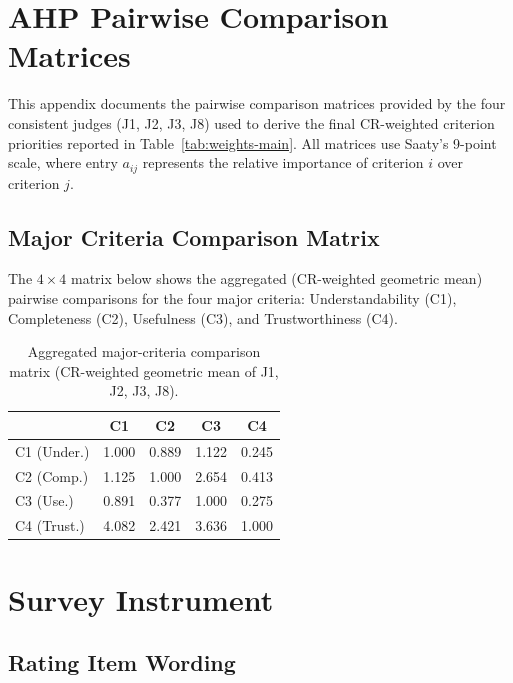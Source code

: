 \chapter{AHP Pairwise Comparison Matrices}
\label{app:ahp}

This appendix documents the pairwise comparison matrices provided by the four
consistent judges (J1, J2, J3, J8) used to derive the final CR-weighted criterion
priorities reported in Table~\ref{tab:weights-main}. All matrices use Saaty's
9-point scale, where entry $a_{ij}$ represents the relative importance of criterion
$i$ over criterion $j$.

\section*{Major Criteria Comparison Matrix}
\label{appsec:major-matrix}

The $4 \times 4$ matrix below shows the aggregated (CR-weighted geometric mean)
pairwise comparisons for the four major criteria: Understandability (C1),
Completeness (C2), Usefulness (C3), and Trustworthiness (C4).

\begin{table}[H]
  \centering
  \caption{Aggregated major-criteria comparison matrix (CR-weighted geometric mean
    of J1, J2, J3, J8).}
  \label{tab:app-major}
  \begin{tabular}{lcccc}
    \toprule
              & C1    & C2    & C3    & C4    \\
    \midrule
    C1 (Under.)  & 1.000 & 0.889 & 1.122 & 0.245 \\
    C2 (Comp.)   & 1.125 & 1.000 & 2.654 & 0.413 \\
    C3 (Use.)    & 0.891 & 0.377 & 1.000 & 0.275 \\
    C4 (Trust.)  & 4.082 & 2.421 & 3.636 & 1.000 \\
    \bottomrule
  \end{tabular}
\end{table}

\chapter{Survey Instrument}
\label{app:survey}

\section*{Rating Item Wording}
\label{appsec:items}

